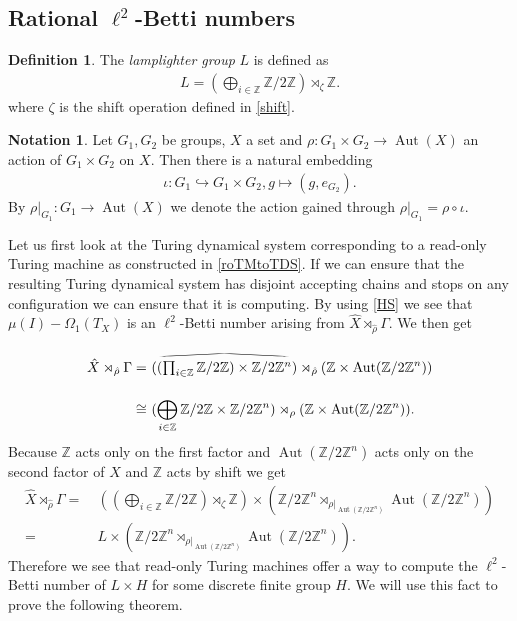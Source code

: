 \documentclass[12pt,a4paper]{scrartcl}
\theoremstyle{plain}
\theoremstyle{definition}
\newtheorem{Definition}[Theorem]{Definition}
\newtheorem{Notation}[Theorem]{Notation}
\newcommand{\Z}{\mathbb{Z}} %
\newcommand{\2}{\mathbb{Z} / 2 \mathbb{Z}}
\newcommand{\1}{\bar{1}}
\newcommand{\0}{\bar{0}}
\newcommand{\Aut}{\operatorname{Aut}}
\newcommand{\reallywidehat}[1]{\arraycolsep=0pt\relax%
	\begin{array}{c}
		\stretchto{
			\scaleto{
				\scalerel*[\widthof{\ensuremath{#1}}]{\kern-.5pt\bigwedge\kern-.5pt}
				{\rule[-\textheight/2]{1ex}{\textheight}} %
			}{\textheight} %
		}{0.5ex}\\           %
		#1\\                 %
		\rule{-1ex}{0ex}
	\end{array}
}
\begin{document}
\subsection{Rational $\ell^2$-Betti numbers}
\begin{Definition}
	The \emph{lamplighter group} $L$ is defined as
	\begin{align*}
		L = (\bigoplus_{i \in \Z} \2) \rtimes_{\zeta} \Z.
	\end{align*}
	where $\zeta$ is the shift operation defined in \ref{shift}.
\end{Definition}
\begin{Notation}
	Let $G_1, G_2$ be groups, $X$ a set and $\rho \colon G_1 \times G_2 \to \Aut(X)$ an action of $G_1 \times G_2$ on $X$. Then there is a natural embedding 
	\begin{align*}
		\iota \colon G_1 \hookrightarrow G_1 \times G_2, g \mapsto (g, e_{G_2}).
	\end{align*}
	By $\rho|_{G_1} \colon G_1 \to \Aut(X)$ we denote the action gained through $ \rho|_{G_1} = \rho \circ \iota$.
\end{Notation}
Let us first look at the Turing dynamical system corresponding to a read-only Turing machine as constructed in \ref{roTMtoTDS}. If we can ensure that the resulting Turing dynamical system has disjoint accepting chains and stops on any configuration we can ensure that it is computing. By using \ref{HS} we see that $\mu (I) - \Omega_1(T_X)$ is an $\ell^2$-Betti number arising from $\hat{X} \rtimes_{\hat{\rho}} \Gamma$. We then get
\begin{align*}
	\hat{X} \rtimes_{\hat{\rho}} \Gamma =&~ (\reallywidehat{(\prod_{i \in \Z} \2) \times \2^n}) \rtimes_{\hat{\rho}} (\Z \times \Aut(\2^n)) \\
	\cong&~ (\bigoplus_{i \in \Z} \2 \times \2^n) \rtimes_{\rho} (\Z \times \Aut(\2^n)).
\end{align*}
Because $\Z$ acts only on the first factor and $\Aut(\2^n)$ acts only on the second factor of $X$ and $\Z$ acts by shift we get
\begin{align*}
	\hat{X} \rtimes_{\hat{\rho}} \Gamma =&~ ((\bigoplus_{i \in \Z} \2) \rtimes_{\zeta} \Z) \times (\2^n \rtimes_{\rho|_{\Aut(\2^n)}} \Aut(\2^n)) \\
	=&~ L \times (\2^n \rtimes_{\rho|_{\Aut(\2^n)}} \Aut(\2^n)).
\end{align*}
Therefore we see that read-only Turing machines offer a way to compute the $\ell^2$-Betti number of $L \times H$ for some discrete finite group $H$. We will use this fact to prove the following theorem.
\end{document}

